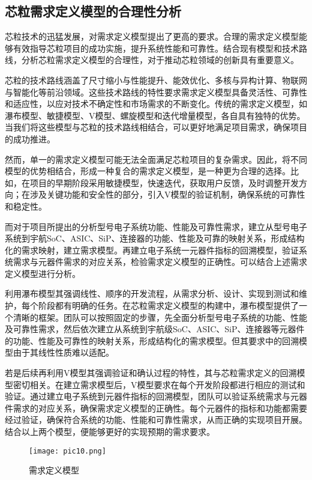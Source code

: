 \documentclass[bachelor]{thesis-uestc}
\begin{document}
\subsection{芯粒需求定义模型的合理性分析}
芯粒技术的迅猛发展，对需求定义模型提出了更高的要求。合理的需求定义模型能够有效指导芯粒项目的成功实施，提升系统性能和可靠性。结合现有模型和技术路线，分析芯粒需求定义模型的合理性，对于推动芯粒领域的创新具有重要意义。


芯粒的技术路线涵盖了尺寸缩小与性能提升、能效优化、多核与异构计算、物联网与智能化等前沿领域。这些技术路线的特性要求需求定义模型具备灵活性、可靠性和适应性，以应对技术不确定性和市场需求的不断变化。传统的需求定义模型，如瀑布模型、敏捷模型、V模型、螺旋模型和迭代增量模型，各自具有独特的优势。当我们将这些模型与芯粒的技术路线相结合，可以更好地满足项目需求，确保项目的成功推进。


然而，单一的需求定义模型可能无法全面满足芯粒项目的复杂需求。因此，将不同模型的优势相结合，形成一种复合的需求定义模型，是一种更为合理的选择。比如，在项目的早期阶段采用敏捷模型，快速迭代，获取用户反馈，及时调整开发方向；在涉及关键功能和安全性的部分，引入V模型的验证机制，确保系统的可靠性和稳定性。


而对于项目所提出的分析型号电子系统功能、性能及可靠性需求，建立从型号电子系统到宇航SoC、ASIC、SiP、连接器的功能、性能及可靠的映射关系，形成结构化的需求映射，建立需求模型。再建立电子系统一元器件指标的回溯模型，验证系统需求与元器件需求的对应关系，检验需求定义模型的正确性。可以结合上述需求定义模型进行分析。


利用瀑布模型其强调线性、顺序的开发流程，从需求分析、设计、实现到测试和维护，每个阶段都有明确的任务。在芯粒需求定义模型的构建中，瀑布模型提供了一个清晰的框架。团队可以按照固定的步骤，先全面分析型号电子系统的功能、性能及可靠性需求，然后依次建立从系统到宇航级SoC、ASIC、SiP、连接器等元器件的功能、性能及可靠性的映射关系，形成结构化的需求模型。但其要求中的回溯模型由于其线性性质难以适配。


若是后续再利用V模型其强调验证和确认过程的特性，其与芯粒需求定义的回溯模型密切相关。在建立需求模型后，V模型要求在每个开发阶段都进行相应的测试和验证。通过建立电子系统到元器件指标的回溯模型，团队可以验证系统需求与元器件需求的对应关系，确保需求定义模型的正确性。每个元器件的指标和功能都需要经过验证，确保符合系统的功能、性能和可靠性需求，从而正确的实现项目开展。结合以上两个模型，便能够更好的实现预期的需求要求。


\begin{figure}[h]
    \texttt{[image: pic10.png]}
    \caption{需求定义模型}
    \label{pic10}
    \end{figure}
\end{document}
